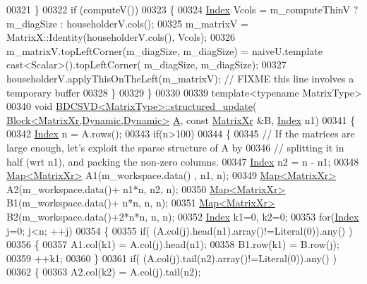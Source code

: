 \begin{DoxyCode}
00321   \}
00322   \textcolor{keywordflow}{if} (computeV())
00323   \{
00324     \hyperlink{namespace_eigen_a62e77e0933482dafde8fe197d9a2cfde}{Index} Vcols = m\_computeThinV ? m\_diagSize : householderV.cols();
00325     m\_matrixV = MatrixX::Identity(householderV.cols(), Vcols);
00326     m\_matrixV.topLeftCorner(m\_diagSize, m\_diagSize) = naiveU.template cast<Scalar>().topLeftCorner(
      m\_diagSize, m\_diagSize);
00327     householderV.applyThisOnTheLeft(m\_matrixV); \textcolor{comment}{// FIXME this line involves a temporary buffer}
00328   \}
00329 \}
00330 
00339 \textcolor{keyword}{template}<\textcolor{keyword}{typename} MatrixType>
00340 \textcolor{keywordtype}{void} \hyperlink{group___s_v_d___module_class_eigen_1_1_b_d_c_s_v_d}{BDCSVD<MatrixType>::structured\_update}(
      \hyperlink{group___core___module_class_eigen_1_1_block}{Block<MatrixXr,Dynamic,Dynamic>} \hyperlink{group___core___module_class_eigen_1_1_matrix}{A}, \textcolor{keyword}{const} 
      \hyperlink{group___core___module}{MatrixXr} &B, \hyperlink{namespace_eigen_a62e77e0933482dafde8fe197d9a2cfde}{Index} n1)
00341 \{
00342   \hyperlink{namespace_eigen_a62e77e0933482dafde8fe197d9a2cfde}{Index} n = A.rows();
00343   \textcolor{keywordflow}{if}(n>100)
00344   \{
00345     \textcolor{comment}{// If the matrices are large enough, let's exploit the sparse structure of A by}
00346     \textcolor{comment}{// splitting it in half (wrt n1), and packing the non-zero columns.}
00347     \hyperlink{namespace_eigen_a62e77e0933482dafde8fe197d9a2cfde}{Index} n2 = n - n1;
00348     \hyperlink{group___core___module_class_eigen_1_1_map}{Map<MatrixXr>} A1(m\_workspace.data()      , n1, n);
00349     \hyperlink{group___core___module_class_eigen_1_1_map}{Map<MatrixXr>} A2(m\_workspace.data()+ n1*n, n2, n);
00350     \hyperlink{group___core___module_class_eigen_1_1_map}{Map<MatrixXr>} B1(m\_workspace.data()+  n*n, n,  n);
00351     \hyperlink{group___core___module_class_eigen_1_1_map}{Map<MatrixXr>} B2(m\_workspace.data()+2*n*n, n,  n);
00352     \hyperlink{namespace_eigen_a62e77e0933482dafde8fe197d9a2cfde}{Index} k1=0, k2=0;
00353     \textcolor{keywordflow}{for}(\hyperlink{namespace_eigen_a62e77e0933482dafde8fe197d9a2cfde}{Index} j=0; j<n; ++j)
00354     \{
00355       \textcolor{keywordflow}{if}( (A.col(j).head(n1).array()!=Literal(0)).any() )
00356       \{
00357         A1.col(k1) = A.col(j).head(n1);
00358         B1.row(k1) = B.row(j);
00359         ++k1;
00360       \}
00361       \textcolor{keywordflow}{if}( (A.col(j).tail(n2).array()!=Literal(0)).any() )
00362       \{
00363         A2.col(k2) = A.col(j).tail(n2);

\end{DoxyCode}
